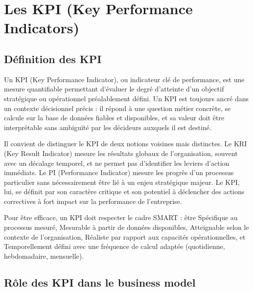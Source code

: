 \documentclass[a4paper,12pt]{report}
\begin{document}

\section{Les KPI (Key Performance Indicators)}

\subsection{Définition des KPI}

Un KPI (Key Performance Indicator), ou indicateur clé de performance, est une
mesure quantifiable permettant d'évaluer le degré d'atteinte d'un objectif
stratégique ou opérationnel préalablement défini. Un KPI est toujours ancré dans
un contexte décisionnel précis : il répond à une question métier concrète, se
calcule sur la base de données fiables et disponibles, et sa valeur doit être
interprétable sans ambiguïté par les décideurs auxquels il est destiné.

Il convient de distinguer le KPI de deux notions voisines mais distinctes. Le KRI
(Key Result Indicator) mesure les résultats globaux de l'organisation, souvent
avec un décalage temporel, et ne permet pas d'identifier les leviers d'action
immédiats. Le PI (Performance Indicator) mesure les progrès d'un processus
particulier sans nécessairement être lié à un enjeu stratégique majeur. Le KPI,
lui, se définit par son caractère critique et son potentiel à déclencher des
actions correctives à fort impact sur la performance de l'entreprise.

Pour être efficace, un KPI doit respecter le cadre SMART : être Spécifique au
processus mesuré, Mesurable à partir de données disponibles, Atteignable selon le
contexte de l'organisation, Réaliste par rapport aux capacités opérationnelles,
et Temporellement défini avec une fréquence de calcul adaptée (quotidienne,
hebdomadaire, mensuelle).

\subsection{Rôle des KPI dans le business model}
\end{document}

